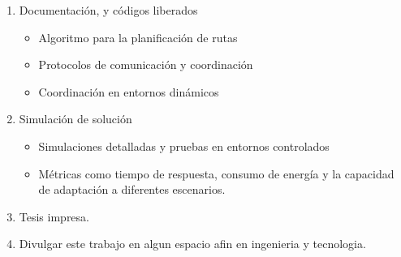 \documentclass[11pt,epsf,times]{article}
\begin{document}
\begin{enumerate}
\item Documentaci\'{o}n, y c\'{o}digos liberados
  \begin{itemize}
  \item Algoritmo para la planificaci\'{o}n de rutas
  \item Protocolos de comunicaci\'{o}n y coordinaci\'{o}n
  \item Coordinaci\'{o}n en entornos din\'{a}micos
  \end{itemize}
\item Simulaci\'{o}n de soluci\'{o}n
  \begin{itemize}
  \item Simulaciones detalladas y pruebas en entornos controlados
  \item M\'{e}tricas como tiempo de respuesta, consumo de energ\'{i}a y la capacidad de adaptaci\'{o}n a diferentes escenarios. 
  \end{itemize}
\item Tesis impresa.
\item Divulgar este trabajo en algun espacio afin en ingenieria y tecnologia.

\end{enumerate}

\newpage


\end{document}
